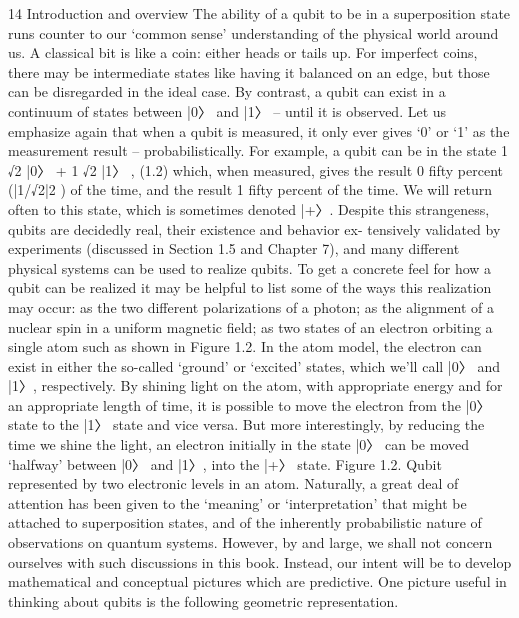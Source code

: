 \documentclass{book}
\begin{document}
14 Introduction and overview
The ability of a qubit to be in a superposition state runs counter to our ‘common sense’
understanding of the physical world around us. A classical bit is like a coin: either heads
or tails up. For imperfect coins, there may be intermediate states like having it balanced
on an edge, but those can be disregarded in the ideal case. By contrast, a qubit can exist
in a continuum of states between |0〉 and |1〉 – until it is observed. Let us emphasize
again that when a qubit is measured, it only ever gives ‘0’ or ‘1’ as the measurement
result – probabilistically. For example, a qubit can be in the state
1
√2 |0〉 + 1
√2 |1〉 , (1.2)
which, when measured, gives the result 0 fifty percent (|1/√2|2 ) of the time, and the
result 1 fifty percent of the time. We will return often to this state, which is sometimes
denoted |+〉.
Despite this strangeness, qubits are decidedly real, their existence and behavior ex-
tensively validated by experiments (discussed in Section 1.5 and Chapter 7), and many
different physical systems can be used to realize qubits. To get a concrete feel for how a
qubit can be realized it may be helpful to list some of the ways this realization may occur:
as the two different polarizations of a photon; as the alignment of a nuclear spin in a
uniform magnetic field; as two states of an electron orbiting a single atom such as shown
in Figure 1.2. In the atom model, the electron can exist in either the so-called ‘ground’
or ‘excited’ states, which we’ll call |0〉 and |1〉, respectively. By shining light on the atom,
with appropriate energy and for an appropriate length of time, it is possible to move
the electron from the |0〉 state to the |1〉 state and vice versa. But more interestingly, by
reducing the time we shine the light, an electron initially in the state |0〉 can be moved
‘halfway’ between |0〉 and |1〉, into the |+〉 state.
Figure 1.2. Qubit represented by two electronic levels in an atom.
Naturally, a great deal of attention has been given to the ‘meaning’ or ‘interpretation’
that might be attached to superposition states, and of the inherently probabilistic nature of
observations on quantum systems. However, by and large, we shall not concern ourselves
with such discussions in this book. Instead, our intent will be to develop mathematical
and conceptual pictures which are predictive.
One picture useful in thinking about qubits is the following geometric representation.
\end{document}
